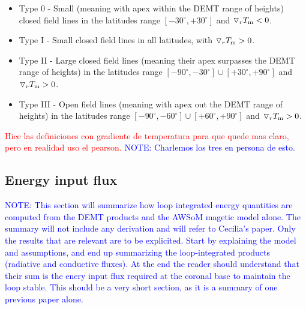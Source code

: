 \documentclass[namedreferences]{solarphysics}
\newcommand{\mdeg}{^\circ}
\newcommand{\dr}{\triangledown_r}
\newcommand{\Tm}{T_{\rm m}}
\def\diego#1{\textcolor{red}{#1}}
\def\notebyalbert#1{\textcolor{blue}{NOTE: #1}}
\begin{document}
\begin{article}
\begin{itemize}
 \item Type 0 - Small (meaning with apex within the DEMT range of heights) closed field lines in the latitudes range $[-30\mdeg,+30\mdeg]$ and $\dr \Tm < 0$. %

\item  Type I - Small closed field lines in all latitudes, with $\dr \Tm > 0$. %

\item  Type II - Large closed field lines (meaning their apex surpasses the DEMT range of heights) in the latitudes range $[-90\mdeg,-30\mdeg] \cup [+30\mdeg,+90\mdeg]$ and $\dr \Tm > 0$. %

\item Type III - Open field lines (meaning with apex out the DEMT range of heights) in the latitudes range $[-90\mdeg,-60\mdeg] \cup [+60\mdeg,+90\mdeg]$ and $\dr \Tm > 0$.

\end{itemize}
\diego{Hice las definiciones con gradiente de temperatura para que quede mas claro, pero en realidad uso el pearson.} \notebyalbert{Charlemos los tres en persona de esto.}

\subsection{{Energy input flux}}\label{energia} 

\noindent\notebyalbert{This section will summarize how loop integrated energy quantities are computed from the DEMT products and the AWSoM magetic model alone. The summary will not include any derivation and will refer to Cecilia's paper. Only the results that are relevant are to be explicited. Start by explaining the model and assumptions, and end up summarizing the loop-integrated products (radiative and conductive fluxes). At the end the reader should understand that their sum is the enery input flux required at the coronal base to maintain the loop stable. This should be a very short section, as it is a summary of one previous paper alone.}


\end{article}
\end{document}
